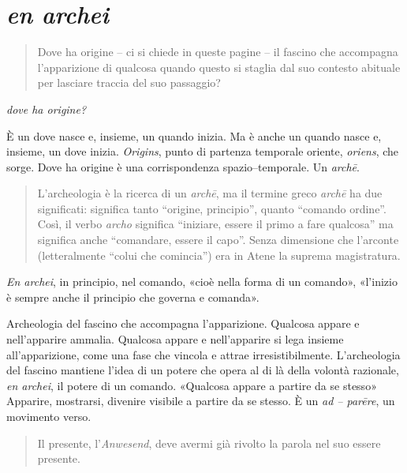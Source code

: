 \section{\emph{en archei}}

\begin{quote}
\begin{sf}
\small
Dove ha origine – ci si chiede in queste pagine – il fascino che accompagna l'apparizione di qualcosa quando questo si staglia dal suo contesto abituale per lasciare traccia del suo passaggio?
\end{sf}
\end{quote}

\emph{dove ha origine?}

È un dove nasce e, insieme, un quando inizia. Ma è anche un quando nasce e, insieme, un dove inizia. \emph{Origins}, punto di partenza temporale oriente, \emph{oriens}, che sorge. Dove ha origine è una corrispondenza spazio–temporale. Un \emph{archē}.


\begin{quote}
\begin{sf}
\small
L'archeologia è la ricerca di un \emph{archē}, ma il termine greco \emph{archē} ha due significati: significa tanto “origine, principio”, quanto “comando ordine”. Così, il verbo \emph{archo} significa “iniziare, essere il primo a fare qualcosa” ma significa anche “comandare, essere il capo”. Senza dimensione che l'arconte (letteralmente “colui che comincia”) era in Atene la suprema magistratura. \cite{agamben2017}
\end{sf}
\end{quote}

\emph{En archei}, in principio, nel comando, «cioè nella forma di un comando», «l'inizio è sempre anche il principio che governa e comanda».

Archeologia del fascino che accompagna l'apparizione. Qualcosa appare e nell'apparire ammalia. Qualcosa appare e nell'apparire si lega insieme all'apparizione, come una fase che vincola e attrae irresistibilmente. L'archeologia del fascino mantiene l'idea di un potere che opera al di là della volontà razionale, \emph{en archei}, il potere di un comando. «Qualcosa appare a partire da se stesso» \cite{agamben2019} Apparire, mostrarsi, divenire visibile a partire da se stesso. È un \emph{ad – parēre}, un movimento verso.

\begin{quote}
\begin{sf}
\small
Il presente, l'\emph{Anwesend}, deve avermi già rivolto la parola nel suo essere presente. \cite{agamben2019}
\end{sf}
\end{quote}

